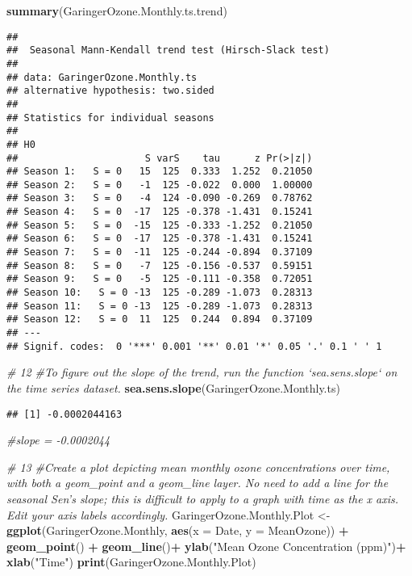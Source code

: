 \documentclass[]{article}
\newenvironment{Shaded}{\begin{snugshade}}{\end{snugshade}}
\newcommand{\CommentTok}[1]{\textcolor[rgb]{0.56,0.35,0.01}{\textit{#1}}}
\newcommand{\DataTypeTok}[1]{\textcolor[rgb]{0.13,0.29,0.53}{#1}}
\newcommand{\KeywordTok}[1]{\textcolor[rgb]{0.13,0.29,0.53}{\textbf{#1}}}
\newcommand{\NormalTok}[1]{#1}
\newcommand{\OperatorTok}[1]{\textcolor[rgb]{0.81,0.36,0.00}{\textbf{#1}}}
\newcommand{\StringTok}[1]{\textcolor[rgb]{0.31,0.60,0.02}{#1}}
\begin{document}
\begin{Shaded}
\begin{Highlighting}[]
\KeywordTok{summary}\NormalTok{(GaringerOzone.Monthly.ts.trend)}
\end{Highlighting}
\end{Shaded}

\begin{verbatim}
## 
##  Seasonal Mann-Kendall trend test (Hirsch-Slack test)
## 
## data: GaringerOzone.Monthly.ts
## alternative hypothesis: two.sided
## 
## Statistics for individual seasons
## 
## H0
##                      S varS    tau      z Pr(>|z|)  
## Season 1:   S = 0   15  125  0.333  1.252  0.21050  
## Season 2:   S = 0   -1  125 -0.022  0.000  1.00000  
## Season 3:   S = 0   -4  124 -0.090 -0.269  0.78762  
## Season 4:   S = 0  -17  125 -0.378 -1.431  0.15241  
## Season 5:   S = 0  -15  125 -0.333 -1.252  0.21050  
## Season 6:   S = 0  -17  125 -0.378 -1.431  0.15241  
## Season 7:   S = 0  -11  125 -0.244 -0.894  0.37109  
## Season 8:   S = 0   -7  125 -0.156 -0.537  0.59151  
## Season 9:   S = 0   -5  125 -0.111 -0.358  0.72051  
## Season 10:   S = 0 -13  125 -0.289 -1.073  0.28313  
## Season 11:   S = 0 -13  125 -0.289 -1.073  0.28313  
## Season 12:   S = 0  11  125  0.244  0.894  0.37109  
## ---
## Signif. codes:  0 '***' 0.001 '**' 0.01 '*' 0.05 '.' 0.1 ' ' 1
\end{verbatim}

\begin{Shaded}
\begin{Highlighting}[]
\CommentTok{# 12}
\CommentTok{#To figure out the slope of the trend, run the function `sea.sens.slope` on the time series dataset. }
\KeywordTok{sea.sens.slope}\NormalTok{(GaringerOzone.Monthly.ts)}
\end{Highlighting}
\end{Shaded}

\begin{verbatim}
## [1] -0.0002044163
\end{verbatim}

\begin{Shaded}
\begin{Highlighting}[]
\CommentTok{#slope = -0.0002044}

\CommentTok{# 13}
\CommentTok{#Create a plot depicting mean monthly ozone concentrations over time, with both a geom_point and a geom_line layer. No need to add a line for the seasonal Sen's slope; this is difficult to apply to a graph with time as the x axis. Edit your axis labels accordingly.}
\NormalTok{GaringerOzone.Monthly.Plot <-}
\KeywordTok{ggplot}\NormalTok{(GaringerOzone.Monthly, }\KeywordTok{aes}\NormalTok{(}\DataTypeTok{x =}\NormalTok{ Date, }\DataTypeTok{y =}\NormalTok{ MeanOzone)) }\OperatorTok{+}
\StringTok{  }\KeywordTok{geom_point}\NormalTok{() }\OperatorTok{+}
\StringTok{  }\KeywordTok{geom_line}\NormalTok{()}\OperatorTok{+}
\StringTok{  }\KeywordTok{ylab}\NormalTok{(}\StringTok{"Mean Ozone Concentration (ppm)"}\NormalTok{)}\OperatorTok{+}
\StringTok{  }\KeywordTok{xlab}\NormalTok{(}\StringTok{"Time"}\NormalTok{)}
\KeywordTok{print}\NormalTok{(GaringerOzone.Monthly.Plot)}
\end{Highlighting}
\end{Shaded}
\end{document}
